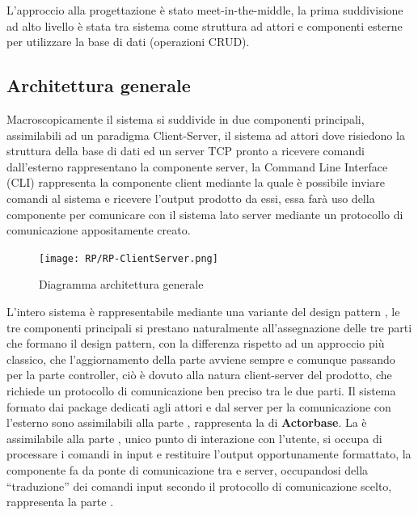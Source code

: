 \documentclass{scalatekids-article}
\begin{document}
L'approccio alla progettazione è stato meet-in-the-middle, la prima
suddivisione ad alto livello è stata tra sistema come struttura ad attori e
componenti esterne per utilizzare la base di dati (operazioni CRUD).

\subsection{Architettura generale}

Macroscopicamente il sistema si suddivide in due componenti principali,
assimilabili ad un paradigma Client-Server, il sistema ad attori dove
risiedono la struttura della base di dati ed un server TCP pronto a ricevere
comandi dall'esterno rappresentano la componente server, la Command Line
Interface (CLI) rappresenta la componente client mediante la quale è possibile
inviare comandi al sistema e ricevere l'output prodotto da essi, essa farà uso
della componente  per comunicare con il sistema lato server
mediante un protocollo di comunicazione appositamente creato.

\begin{figure}[H]
  \begin{center}
    \texttt{[image: RP/RP-ClientServer.png]}
    \caption{Diagramma architettura generale}
  \end{center}
\end{figure}


L'intero sistema è rappresentabile mediante una variante del design pattern
, le tre componenti principali si prestano naturalmente
all'assegnazione delle tre parti che formano il design pattern, con la
differenza rispetto ad un approccio più classico, che l'aggiornamento della
parte  avviene sempre e comunque passando per la parte controller,
ciò è dovuto alla natura client-server del prodotto, che richiede un protocollo
di comunicazione ben preciso tra le due parti. Il sistema formato dai package
dedicati agli attori  e dal server  per la comunicazione
con l'esterno sono assimilabili alla parte , rappresenta la
 di \textbf{Actorbase}. La  è assimilabile alla
parte , unico punto di interazione con l'utente, si occupa di
processare i comandi in input e restituire l'output opportunamente formattato,
la componente  fa da ponte di comunicazione tra  e
server, occupandosi della ``traduzione'' dei comandi input secondo il protocollo
di comunicazione scelto, rappresenta la parte .
\end{document}
